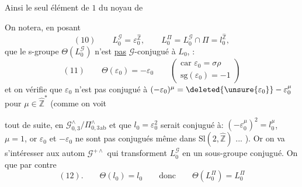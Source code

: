 Ainsi le seul élément \inserted{$\Theta$}  de $1$
du noyau de  


On notera,  en posant
\[
(10)\qquad L_{0}^{\mathcal{G}}=\varepsilon_{0}^{\widehat{\mathbb{Z}}},\qquad
L_{0}^{\Pi}=L_{0}^{\mathcal{G}}\cap\Pi=l_{0}^{\widehat{\mathbb{Z}}},
\]
que le s-groupe $\Theta(L_{0}^{\mathcal{G}})$
n'est \uline{pas} $\mathcal{G}$-conjugué à $L_{0}$,
 
 
\deleted{\unsure{$\Theta\varepsilon$}} :
\[
(11)\qquad \Theta(\varepsilon_{0})=-\varepsilon_{0}
\qquad\left(\begin{gathered}
\text{car }\varepsilon_{0}=\sigma\rho\\
\mathrm{sg}(\varepsilon_{0})=-1
\end{gathered}\right)
\]
et on vérifie que $\varepsilon_{0}$ n'est pas conjugué à
$(-\varepsilon_{0})^{\mu}=\deleted{\unsure{\varepsilon_{0}}}-\varepsilon_{0}^{\mu}$
pour  $\mu\in\widehat{\mathbb{Z}}^{*}$ (comme on voit




tout de suite, en 
$\mathcal{G}_{0,3}^{\wedge}/\Pi_{0,3}^{\wedge}{}_{\mathrm{ab}}$
et  que $l_{0}=\varepsilon_{0}^{2}$ serait
conjugué à: $(-\varepsilon_{0}^{\mu})^{2}=l_{0}^{\mu}$,
 $\mu=1$, or
$\varepsilon_{0}$ et $-\varepsilon_{0}$ ne sont pas conjugués
même dans $\mathrm{Sl}(2,\widehat{\mathbb{Z}})$ ... ). Or on va
s'intéresser  aux autom 
$\mathcal{G}^{+\wedge}$ qui transforment $L_{0}^{\mathcal{G}}$ en un sous-groupe
conjugué. On  que par contre
\[
(12).\qquad \Theta(l_{0})=l_{0}\qquad\text{donc}\qquad
\Theta(L_{0}^{\Pi})=L_{0}^{\Pi}
\]


